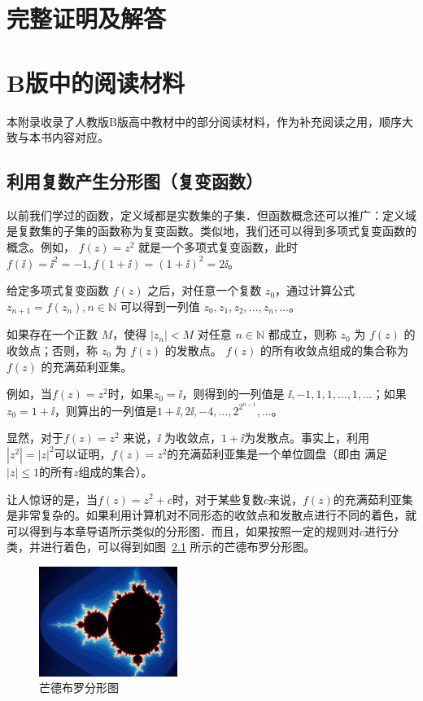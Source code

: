 \documentclass[a4paper,openany]{ctexbook}
\newcommand{\showproofs}{\allproofs}%
\begin{document}
\appendix

\chapter{完整证明及解答}
\showproofs

\chapter{B版中的阅读材料}

本附录收录了人教版B版高中教材中的部分阅读材料，作为补充阅读之用，顺序大致与本书内容对应。

\section{利用复数产生分形图（复变函数）}

以前我们学过的函数，定义域都是实数集的子集．但函数概念还可以推广：定义域是复数集的子集的函数称为复变函数。类似地，我们还可以得到多项式复变函数的概念。例如，%
\(f(z)=z^2\) 就是一个多项式复变函数，此时 \(f(\ii)=\ii^2=-1,f(1+\ii)=(1+\ii)^2=2\ii\)。

给定多项式复变函数 \(f(z)\) 之后，对任意一个复数 \(z_0\)，通过计算公式 \(z_{n+1}=f(z_n),n\in \mathbb{N}\) 可以得到一列值 \(z_0,z_1,z_2,\dots,z_n,\dots\)。

如果存在一个正数 \(M\)，使得 \(|z_n|<M\) 对任意 \(n\in \mathbb{N}\) 都成立，则称 \(z_0\) 为 \(f(z)\) 的收敛点；否则，称 \(z_0\) 为 \(f(z)\) 的发散点。%
\(f(z)\) 的所有收敛点组成的集合称为 \(f(z)\) 的充满茹利亚集。

例如，当\(f(z)=z^2\)时，如果\(z_0=\ii\)，则得到的一列值是 \(\ii,-1,1,1,\dots,1,\dots\)；如果 \(z_0=1+\ii\)，则算出的一列值是\(1+\ii,2\ii,-4,\dots,2^{2^{n-1}},\dots\)。

显然，对于\(f(z)=z^2\) 来说，\(\ii\) 为收敛点，\(1+\ii\)为发散点。事实上，利用\(|z^2|=|z|^2\)可以证明，\(f(z)=z^2\)的充满茹利亚集是一个单位圆盘（即由
满足\(|z|\le 1\)的所有\(z\)组成的集合）。

让人惊讶的是，当\(f(z)=z^2+c\)时，对于某些复数\(c\)来说，\(f(z)\)的充满茹利亚集是非常复杂的。如果利用计算机对不同形态的收敛点和发散点进行不同的着色，就
可以得到与本章导语所示类似的分形图．而且，如果按照一定的规则对\(c\)进行分类，并进行着色，可以得到如图~\ref{fgr:mhdebuloffxktu} 所示的芒德布罗分形图。

\begin{figure}
    \centering
    \includegraphics[width=0.4\textwidth]{image6.png}
    \caption{芒德布罗分形图}\label{fgr:mhdebuloffxktu}
\end{figure}
\end{document}
